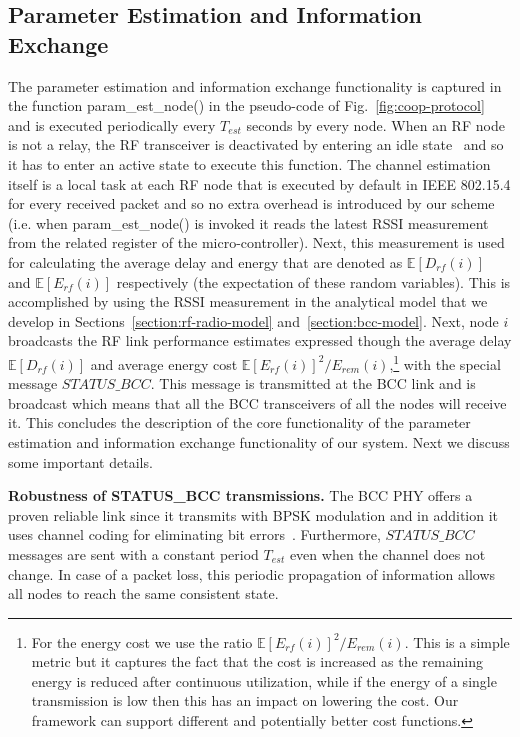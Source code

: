 \documentclass[10pt]{IEEEtran}
\newcounter{section:outage-analysis}
\begin{document}
\subsection{Parameter Estimation and Information Exchange}
\label{subsection:1}
The parameter estimation and information exchange functionality is captured in the function param\_est\_node() in the pseudo-code of Fig.~\ref{fig:coop-protocol} and is executed periodically every $T_{est}$ seconds by every node. When an RF node is not a relay, the RF transceiver is deactivated by entering an idle state~\cite{cc2420} and so it has to enter an active state to execute this function. The channel estimation itself is a local task at each RF node that is executed by default in IEEE 802.15.4 for every received packet and so no extra overhead is introduced by our scheme (i.e. when param\_est\_node() is invoked it reads the latest RSSI measurement from the related register of the micro-controller). Next, this measurement is used for calculating the average delay and energy that are denoted as $\mathbb{E}[D_{rf}(i)]$  and $\mathbb{E}[E_{rf}(i)]$ respectively (the expectation of these random variables). This is accomplished by using the RSSI measurement in the analytical model that we develop in Sections~\ref{section:rf-radio-model} and~\ref{section:bcc-model}. Next, node $i$ broadcasts the RF link performance estimates expressed though the average delay $\mathbb{E}[D_{rf}(i)]$ and average energy cost $ \mathbb{E}[E_{rf}(i)]^2/ E_{rem}(i)$,\footnote{For the energy cost we use the ratio $ \mathbb{E}[E_{rf}(i)]^2/ E_{rem}(i)$. This is a simple metric but it captures the fact that the cost is increased as the remaining energy is reduced after continuous utilization, while if the energy of a single transmission is low then this has an impact on lowering the cost. Our framework can support different and potentially better cost functions.} with the special message $STATUS\_BCC$. This message is transmitted at the BCC link and is broadcast which means that all the BCC transceivers of all the nodes will receive it. This concludes the description of the core functionality of the parameter estimation and information exchange functionality of our system. Next we discuss some important details.

\textbf{Robustness of STATUS\_BCC transmissions.}
The BCC PHY offers a proven reliable link since it transmits with BPSK modulation and in addition it uses channel coding for eliminating bit errors~\cite{fazzi09}. Furthermore, $STATUS\_BCC$ messages are sent with a constant period $T_{est}$ even when the channel does not change. In case of a packet loss, this periodic propagation of information allows all nodes to reach the same consistent state.
\end{document}
